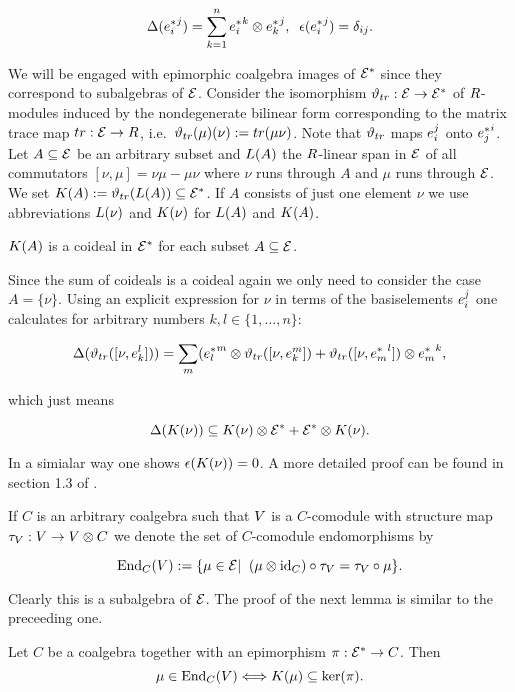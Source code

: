 \documentclass[twoside,12pt]{article}
\begin{document}
\[ \Delta ({{e}^*_{i}}^{j})=\sum_{k=1}^n {{e}^*_{i}}^{k}  \otimes {{e}^*_{k}}^{j} ,\; \; \epsilon ({{e}^*_{i}}^{j})
=\delta_{ij}.\]

We will be engaged with epimorphic coalgebra images of ${{\cal E}}^*$ since
they correspond to subalgebras of ${\cal E}$. Consider the isomorphism
${\vartheta}_{tr} :{\cal E} \rightarrow {{\cal E}}^*$ of $R$-modules induced by 
the nondegenerate bilinear form corresponding to 
the matrix trace map $tr :{\cal E} \rightarrow R$, i.e.\ ${\vartheta}_{tr}(\mu)(\nu):= tr(\mu\nu)$.
Note that ${\vartheta}_{tr}$ maps $e_{i}^{ j}$ onto ${{e}^*_{j}}^{i}$.
Let $A\subseteq {\cal E}$ be an arbitrary
subset and $L(A)$ the $R$-linear span in ${\cal E}$ of all commutators
$[\nu, \mu ]=\nu\mu-\mu\nu$ where $\nu$ runs through $A$ and $\mu$
runs through ${\cal E}$. We set $K(A):={\vartheta}_{tr} (L(A))\subseteq {{\cal E}}^*$. If $A$ consists of
just one element $\nu$ we use abbreviations $L(\nu)$ and $K(\nu)$
for $L(A)$ and $K(A)$.

\begin{lem} \label{Koideal}
$K(A)$ is a coideal in ${{\cal E}}^*$ for each subset $A\subseteq {\cal E}$.
\end{lem}

\begin{PfS}
Since the sum of coideals is a coideal again we only need to consider
the case $A=\{\nu\}$. Using an explicit expression for $\nu$ 
in terms of the basiselements $e_{i}^{ j}$ one
calculates for arbitrary numbers $k,l \in \{1,\ldots, n\}$:

\[ \Delta ({\vartheta}_{tr}([\nu ,e_{k}^{ l}]))=
\sum_m (
{{e}^*_{l}}^{m}\otimes{\vartheta}_{tr}([\nu,e_{k}^{ m}]) +
{\vartheta}_{tr}([\nu, {{e}^*_{m}}^{l}]) \otimes {{e}^*_{m}}^{k},
\]

which just means

\[ \Delta (K(\nu)) \subseteq K(\nu) \otimes {{\cal E}}^* + {{\cal E}}^*
\otimes K(\nu). \]

In a simialar way one shows $\epsilon(K(\nu))=0$. A more detailed proof
can be found in section 1.3 of
\cite{doc}.
\end{PfS}

If $C$ is an arbitrary coalgebra such that $V$ is a $C$-comodule
with structure map $\tau_{V}:V \rightarrow V \otimes C$ we denote the set of $C$-comodule
endomorphisms by

\[ {\rm End}_{C}{(V)}:=\{
\mu \in {\cal E}|\; \; (\mu \otimes {\rm id}_{C}) \circ \tau_{V}= \tau_{V} 
\circ \mu \}.\]

Clearly this is a subalgebra of ${\cal E}$. The proof of the next lemma is
similar to the preceeding one.

\begin{lem} \label{Koalgebren Endomorphismen}
Let $C$ be a coalgebra together with an epimorphism
$\pi: {{\cal E}}^* \rightarrow C$. Then
\[ \mu \in {\rm End}_{C}{(V)} \Longleftrightarrow K(\mu)  \subseteq {\rm ker}(\pi).
\]
\end{lem}
\end{document}
